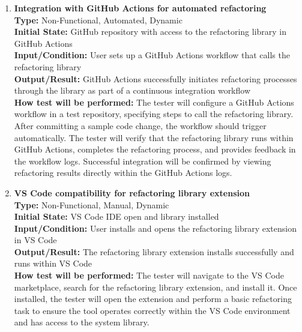 \documentclass[12pt, titlepage]{article}
\begin{document}
\begin{enumerate}[label={\bf \textcolor{Maroon}{test-OPE-\arabic*}}, wide=0pt, font=\itshape]
  \item \textbf{Integration with GitHub Actions for automated refactoring} \\[2mm]
    \textbf{Type:} Non-Functional, Automated, Dynamic \\
    \textbf{Initial State:} GitHub repository with access to the refactoring library in GitHub Actions \\
    \textbf{Input/Condition:} User sets up a GitHub Actions workflow that calls the refactoring library \\
    \textbf{Output/Result:} GitHub Actions successfully initiates refactoring processes through the library as part of a continuous integration workflow \\[2mm]
    \textbf{How test will be performed:} The tester will configure a GitHub Actions workflow in a test repository, specifying steps to call the refactoring library. After committing a sample code change, the workflow should trigger automatically. The tester will verify that the refactoring library runs within GitHub Actions, completes the refactoring process, and provides feedback in the workflow logs. Successful integration will be confirmed by viewing refactoring results directly within the GitHub Actions logs.

  \item \textbf{VS Code compatibility for refactoring library extension} \\[2mm]
    \textbf{Type:} Non-Functional, Manual, Dynamic \\
    \textbf{Initial State:} VS Code IDE open and library installed\\
    \textbf{Input/Condition:} User installs and opens the refactoring library extension in VS Code \\
    \textbf{Output/Result:} The refactoring library extension installs successfully and runs within VS Code \\[2mm]
    \textbf{How test will be performed:} The tester will navigate to the VS Code marketplace, search for the refactoring library extension, and install it. Once installed, the tester will open the extension and perform a basic refactoring task to ensure the tool operates correctly within the VS Code environment and has access to the system library.


\end{enumerate}
\end{document}
